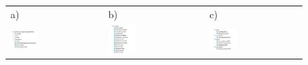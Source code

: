 \begin{figure}[htb]
  \centering
	\begin{tabular}{@{}lll@{}}
	a) & b) & c) \\
  \includegraphics[width=0.3\textwidth]{rys05/backend/ogolne.pdf} & 
	\includegraphics[width=0.3\textwidth]{rys05/backend/controller.pdf} &
	\includegraphics[width=0.3\textwidth]{rys05/backend/dto.pdf} \\


\end{tabular}
\end{figure}

